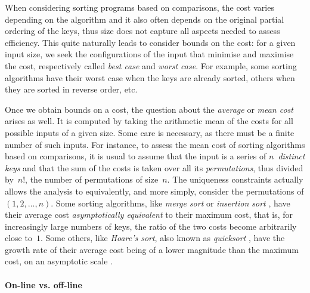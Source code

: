 
When considering sorting programs based on comparisons, the cost
varies depending on the algorithm and it also often depends on the
original partial ordering of the keys, thus size does not capture all
aspects needed to assess efficiency. This quite naturally leads to
consider bounds on the cost: for a given input size, we seek the
configurations of the input that minimise and maximise the cost,
respectively called \emph{best case} and \emph{worst case}. For
example, some sorting algorithms have their worst case when the keys
are already sorted, others when they are sorted in reverse order, etc.


\label{par:mean_sort}

Once we obtain bounds on a cost, the question about the \emph{average}
or \emph{mean cost} \citep{VitterFlajolet_1990}
\citep[\S{}1.2.10]{Knuth_1997} arises as well. It is computed by
taking the arithmetic mean of the costs for all possible inputs of a
given size. Some care is necessary, as there must be a finite number
of such inputs. For instance, to assess the mean cost of sorting
algorithms based on comparisons, it is usual to assume that the input
is a series of \(n\)~\emph{distinct
  keys} and that the sum of the costs is
taken over all its \emph{permutations}, thus
divided by~\(n!\), the number of permutations of size~\(n\). The
uniqueness constraints actually allows the analysis to equivalently,
and more simply, consider the permutations of \((1,2,\dots,n)\). Some
sorting algorithms, like \emph{merge sort}
\cite[\S{}5.2.4]{Knuth_1998} \cite[\S{}2.3]{CLRS_2009} or
\emph{insertion sort} \cite[\S{}5.2.1]{Knuth_1998}
\cite[\S{}2.1]{CLRS_2009}, have their average cost
\emph{asymptotically equivalent} to their maximum cost, that is, for
increasingly large numbers of keys, the ratio of the two costs become
arbitrarily close to~\(1\). Some others,
like \emph{Hoare's sort}, also known as \emph{quicksort}
\cite[\S{}5.2.2]{Knuth_1998} \cite[\S{}7]{CLRS_2009}, have the growth
rate of their average cost being of a lower magnitude than the maximum
cost, on an asymptotic scale \cite[\S{}9]{GrahamKnuthPatashnik_1994}.

\paragraph{On-line vs. off-line}
\label{par:online_vs_offline}

